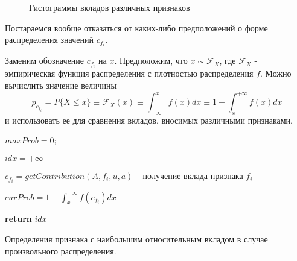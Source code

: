 \documentclass[12pt,a4paper]{report}
\begin{document}
\begin{figure}[pH]
\begin{minipage}[h]{0.49\linewidth}
\end{minipage}
\hfill
\begin{minipage}[h]{0.49\linewidth}
\end{minipage}
\begin{minipage}[h]{1.\linewidth}
\end{minipage}
\caption{Гистограммы вкладов различных признаков}
\label{ris:contriball}
\end{figure}

Постараемся вообще отказаться от каких-либо предположений о форме распределения значений $c_{f_i}$.

Заменим обозначение $c_{f_i}$ на $x$.
Предположим, что $x \sim \mathcal{F}_{X}$, где $\mathcal{F}_{X}$ - эмпирическая функция распределения с плотностью распределения $f$. Можно вычислить значение величины 
\begin{equation*}
p_{c_{f_i}} = \textit{P}\{X \le x\} \equiv \mathcal{F}_X(x) \equiv \int_{-\infty}^{x}f(x)dx \equiv 1 - \int_{x}^{+\infty}f(x)dx
\end{equation*}
и использовать ее для сравнения вкладов, вносимых различными признаками.

\begin{algorithm}[H]
\SetAlgoLined
{}

$maxProb = 0$;

$idx = +\infty$

 {

$c_{f_i} = getContribution(A, f_i, u, a)$ -- получение вклада признака $f_i$

$curProb = 1 - \int_{x}^{+\infty}f(c_{f_i})dx$

}

\textbf{return} $idx$
\caption{Определения признака с наибольшим относительным вкладом в случае произвольного распределения.}
\label{alg:AFAI}
\end{algorithm}
\end{document}

